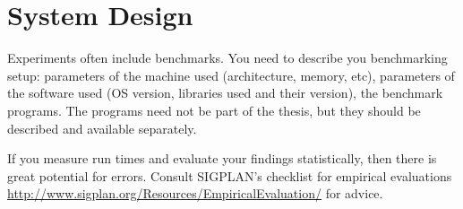 \chapter{System Design}\label{chap:design}

Experiments often include benchmarks.
You need to describe you benchmarking setup: parameters of the machine used (architecture, memory, etc), parameters of the software used (OS version, libraries used and their version), the benchmark programs.
The programs need not be part of the thesis, but they should be described and available separately.

If you measure run times and evaluate your findings statistically, then there is great potential for errors.
Consult SIGPLAN's checklist for empirical evaluations \url{http://www.sigplan.org/Resources/EmpiricalEvaluation/} for advice. 


